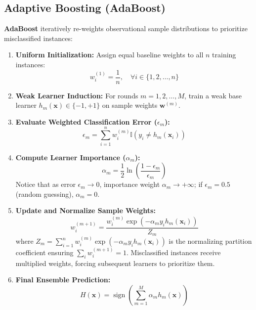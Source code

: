 \subsection{Adaptive Boosting (AdaBoost)}
\textbf{AdaBoost} iteratively re-weights observational sample distributions to prioritize misclassified instances:
\begin{enumerate}
    \item \textbf{Uniform Initialization:} Assign equal baseline weights to all $n$ training instances:
    \begin{equation}
        w_i^{(1)} = \frac{1}{n}, \quad \forall i \in \{1, 2, \dots, n\}
    \end{equation}
    \item \textbf{Weak Learner Induction:} For rounds $m = 1, 2, \dots, M$, train a weak base learner $h_m(\mathbf{x}) \in \{-1, +1\}$ on sample weights $\mathbf{w}^{(m)}$.
    \item \textbf{Evaluate Weighted Classification Error ($\epsilon_m$):}
    \begin{equation}
        \epsilon_m = \sum_{i=1}^n w_i^{(m)} \mathbb{I}(y_i \neq h_m(\mathbf{x}_i))
    \end{equation}
    \item \textbf{Compute Learner Importance ($\alpha_m$):}
    \begin{equation}
        \alpha_m = \frac{1}{2} \ln \left( \frac{1 - \epsilon_m}{\epsilon_m} \right)
    \end{equation}
    Notice that as error $\epsilon_m \to 0$, importance weight $\alpha_m \to +\infty$; if $\epsilon_m = 0.5$ (random guessing), $\alpha_m = 0$.
    \item \textbf{Update and Normalize Sample Weights:}
    \begin{equation}
        w_i^{(m+1)} = \frac{w_i^{(m)} \exp(-\alpha_m y_i h_m(\mathbf{x}_i))}{Z_m}
    \end{equation}
    where $Z_m = \sum_{i=1}^n w_i^{(m)} \exp(-\alpha_m y_i h_m(\mathbf{x}_i))$ is the normalizing partition coefficient ensuring $\sum_i w_i^{(m+1)} = 1$. Misclassified instances receive multiplied weights, forcing subsequent learners to prioritize them.
    \item \textbf{Final Ensemble Prediction:}
    \begin{equation}
        H(\mathbf{x}) = \operatorname{sign}\left( \sum_{m=1}^M \alpha_m h_m(\mathbf{x}) \right)
    \end{equation}
\end{enumerate}


